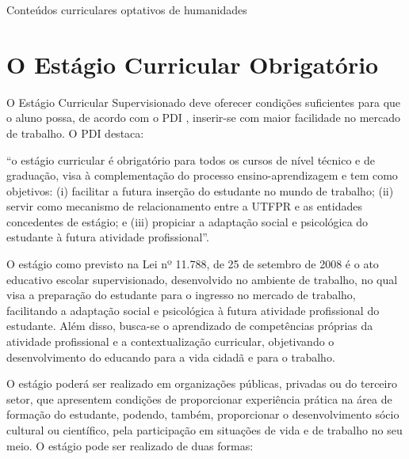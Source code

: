 \clearpage

\begin{table}[!htb]
	\centering\footnotesize
	\caption{Conteúdos curriculares optativos de humanidades}
	\label{qua:ucHUM} %
\end{table}

\clearpage


\clearpage


\section{O Estágio Curricular Obrigatório}

O Estágio Curricular Supervisionado deve oferecer condições suficientes para que o aluno possa, de acordo com o PDI \cite{pdiutfpr}, inserir-se com maior facilidade no mercado de trabalho. O PDI destaca:

\begin{citacao}
	``o estágio curricular é obrigatório para todos os cursos de nível técnico e de graduação, visa à complementação do processo ensino-aprendizagem e tem como objetivos: (i) facilitar a futura inserção do estudante no mundo de trabalho; (ii) servir como mecanismo de relacionamento entre a UTFPR e as entidades concedentes de estágio; e (iii) propiciar a adaptação social e psicológica do estudante à futura atividade profissional''.
\end{citacao}


O estágio como previsto na Lei nº 11.788, de 25 de setembro de 2008 \cite{Lei:11788:2008} é o ato educativo escolar supervisionado, desenvolvido no ambiente de trabalho, no qual visa a preparação do estudante para o ingresso no mercado de trabalho, facilitando a adaptação social e psicológica à futura atividade profissional do estudante. Além disso, busca-se o aprendizado de competências próprias da atividade profissional e a contextualização curricular, objetivando o desenvolvimento do educando para a vida cidadã e para o trabalho.

O estágio poderá ser realizado em organizações públicas, privadas ou do terceiro setor, que apresentem condições de proporcionar experiência prática na área de formação do estudante, podendo, também, proporcionar o desenvolvimento sócio cultural ou científico, pela participação em situações de vida e de trabalho no seu meio. O estágio pode ser realizado de duas formas:

